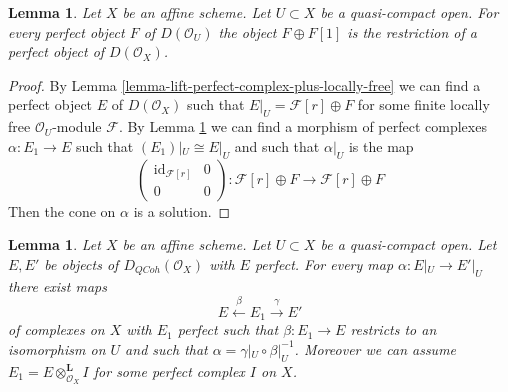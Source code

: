 \documentclass{amsart}
\theoremstyle{plain}
\newtheorem{lemma}[subsection]{Lemma}
\theoremstyle{definition}
\theoremstyle{remark}
\numberwithin{equation}{subsection}
\def\QCoh{\mathit{QCoh}}
\begin{document}
\begin{lemma}
\label{lemma-lift-perfect-complex-plus-shift}
Let $X$ be an affine scheme. Let $U \subset X$ be a quasi-compact open.
For every perfect object $F$ of $D(\mathcal{O}_U)$
the object $F \oplus F[1]$ is the restriction of
a perfect object of $D(\mathcal{O}_X)$.
\end{lemma}

\begin{proof}
By Lemma \ref{lemma-lift-perfect-complex-plus-locally-free}
we can find a perfect object $E$ of $D(\mathcal{O}_X)$
such that $E|_U = \mathcal{F}[r] \oplus F$ for some finite locally
free $\mathcal{O}_U$-module $\mathcal{F}$.
By Lemma \ref{lemma-lift-map} we can find a morphism of
perfect complexes $\alpha : E_1 \to E$ such that $(E_1)|_U \cong E|_U$
and such that $\alpha|_U$ is the map
$$
\left(
\begin{matrix}
\text{id}_{\mathcal{F}[r]} & 0 \\
0 & 0
\end{matrix}
\right)
:
\mathcal{F}[r] \oplus F \to \mathcal{F}[r] \oplus F
$$
Then the cone on $\alpha$ is a solution.
\end{proof}


\begin{lemma}
\label{lemma-lift-map}
Let $X$ be an affine scheme. Let $U \subset X$ be a quasi-compact open.
Let $E, E'$ be objects of $D_\QCoh(\mathcal{O}_X)$ with $E$ perfect.
For every map $\alpha : E|_U \to E'|_U$ there exist maps
$$
E \xleftarrow{\beta} E_1 \xrightarrow{\gamma} E'
$$
of complexes on $X$ with $E_1$ perfect such that $\beta : E_1 \to E$
restricts to an isomorphism on $U$ and such that
$\alpha = \gamma|_U \circ \beta|_U^{-1}$.
Moreover we can assume $E_1 = E \otimes_{\mathcal{O}_X}^\mathbf{L} I$
for some perfect complex $I$ on $X$.
\end{lemma}
\end{document}
